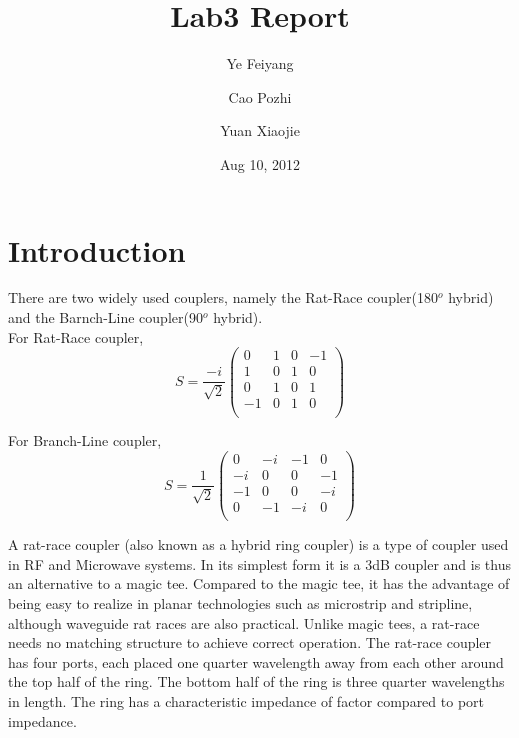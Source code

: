 \documentclass[11pt,a4paper]{report}
\begin{document}
\title{Lab3 Report}

\author{Ye Feiyang \and Cao Pozhi \and Yuan Xiaojie}

\date{Aug 10, 2012}

\maketitle

\section*{Introduction}
There are two widely used couplers, namely the Rat-Race coupler(180\(^o\) hybrid) and the Barnch-Line coupler(90\(^o\) hybrid).\\

For Rat-Race coupler, \\
\begin{equation}
S = \frac{-i}{\sqrt{2}}
\left(
\begin{array}{cccc}
0 & 1 & 0 & -1 \\
1 & 0 & 1 & 0 \\
0 & 1 & 0 & 1 \\
-1 & 0 & 1 & 0 \\
\end{array}
\right)
\end{equation}

For Branch-Line coupler, \\
\begin{equation}
S = \frac{1}{\sqrt{2}}
\left(
\begin{array}{cccc}
0 & -i & -1 & 0 \\
-i & 0 & 0 & -1 \\
-1 & 0 & 0 & -i \\
0 & -1 & -i & 0 \\
\end{array}
\right)
\end{equation}

A rat-race coupler (also known as a hybrid ring coupler) is a type of coupler used in RF and Microwave systems. In its simplest form it is a 3dB coupler and is thus an alternative to a magic tee. Compared to the magic tee, it has the advantage of being easy to realize in planar technologies such as microstrip and stripline, although waveguide rat races are also practical. Unlike magic tees, a rat-race needs no matching structure to achieve correct operation.
The rat-race coupler has four ports, each placed one quarter wavelength away from each other around the top half of the ring. The bottom half of the ring is three quarter wavelengths in length. The ring has a characteristic impedance of factor compared to port impedance. \\
\end{document}
